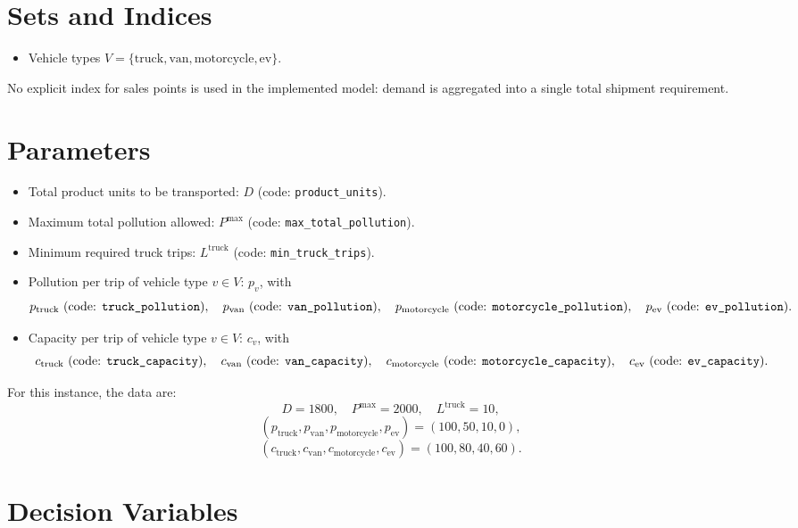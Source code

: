 \section*{Sets and Indices}

\begin{itemize}
    \item Vehicle types \(V = \{\text{truck}, \text{van}, \text{motorcycle}, \text{ev}\}\).
\end{itemize}

No explicit index for sales points is used in the implemented model: demand is aggregated into a single total shipment requirement.

\section*{Parameters}

\begin{itemize}
    \item Total product units to be transported: \(D\) (code: \texttt{product\_units}).
    \item Maximum total pollution allowed: \(P^{\max}\) (code: \texttt{max\_total\_pollution}).
    \item Minimum required truck trips: \(L^{\text{truck}}\) (code: \texttt{min\_truck\_trips}).
    \item Pollution per trip of vehicle type \(v \in V\): \(p_v\), with
    \[
    p_{\text{truck}} \text{ (code: \texttt{truck\_pollution})},\quad
    p_{\text{van}} \text{ (code: \texttt{van\_pollution})},\quad
    p_{\text{motorcycle}} \text{ (code: \texttt{motorcycle\_pollution})},\quad
    p_{\text{ev}} \text{ (code: \texttt{ev\_pollution})}.
    \]
    \item Capacity per trip of vehicle type \(v \in V\): \(c_v\), with
    \[
    c_{\text{truck}} \text{ (code: \texttt{truck\_capacity})},\quad
    c_{\text{van}} \text{ (code: \texttt{van\_capacity})},\quad
    c_{\text{motorcycle}} \text{ (code: \texttt{motorcycle\_capacity})},\quad
    c_{\text{ev}} \text{ (code: \texttt{ev\_capacity})}.
    \]
\end{itemize}

For this instance, the data are:
\[
D=1800,\quad P^{\max}=2000,\quad L^{\text{truck}}=10,
\]
\[
(p_{\text{truck}},p_{\text{van}},p_{\text{motorcycle}},p_{\text{ev}})=(100,50,10,0),
\]
\[
(c_{\text{truck}},c_{\text{van}},c_{\text{motorcycle}},c_{\text{ev}})=(100,80,40,60).
\]

\section*{Decision Variables}

